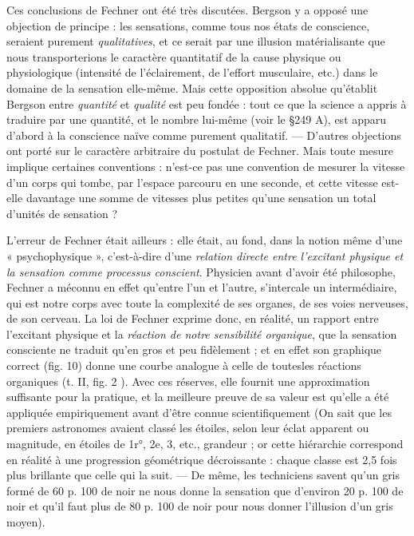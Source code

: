 \vspace{0.24cm}
{\footnotesize 
Ces conclusions de Fechner ont
été très discutées. Bergson y a
opposé une objection de principe :
les sensations, comme tous nos états
de conscience, seraient purement
{\it qualitatives}, et ce serait par une illusion matérialisante que nous
transporterions le caractère quantitatif de la cause physique ou physiologique
(intensité de l’éclairement, de l'effort musculaire, etc.) dans le domaine
de la sensation elle-même. Mais cette opposition absolue qu'établit Bergson
entre {\it quantité} et {\it qualité} est peu fondée : tout ce que la science a
appris à traduire par une quantité, et le nombre lui-même (voir le
\S 249 A), est apparu d’abord à la conscience naïve comme purement qualitatif.
— D’autres objections ont porté sur le caractère arbitraire du postulat
de Fechner. Mais toute mesure implique certaines conventions : n’est-ce
pas une convention de mesurer la vitesse d’un corps qui tombe, par l’espace
parcouru en une seconde, et cette vitesse est-elle davantage une somme de
vitesses plus petites qu'une sensation un total d'unités de sensation ?}
\vspace{0.31cm}

 



L'erreur de Fechner était ailleurs : elle était, au fond, dans la
notion même d’une « psychophysique », c’est-à-dire d’une {\it relation
directe entre l’excitant physique et la sensation comme processus conscient}.
Physicien avant d’avoir été philosophe, Fechner a méconnu en
effet qu’entre l’un et l’autre, s’intercale un intermédiaire, qui est
notre corps avec toute la complexité de ses organes, de ses voies
nerveuses, de son cerveau. La loi de Fechner exprime donc, en réalité,
un rapport entre l’excitant physique et la {\it réaction de notre sensibilité
organique}, que la sensation consciente ne traduit qu’en gros et peu
fidèlement ; et en effet son graphique correct (fig. 10) donne une courbe
analogue à celle de toutesles réactions organiques (t. II, fig. 2 ). Avec ces
réserves, elle fournit une approximation suffisante pour la pratique,
et la meilleure preuve de sa valeur est qu’elle a été appliquée empiriquement
avant d’être connue scientifiquement
{\scriptsize (On sait que les premiers astronomes avaient classé les étoiles, selon leur éclat
apparent ou magnitude, en étoiles de 1r°, 2e, 3, etc., grandeur ; or cette hiérarchie
correspond en réalité à une progression géométrique décroissante : chaque classe est
2,5 fois plus brillante que celle qui la suit. — De même, les techniciens savent qu’un
gris formé de 60 p. 100 de noir ne nous donne la sensation que d'environ 20 p. 100 de
noir et qu’il faut plus de 80 p. 100 de noir pour nous donner l'illusion d’un gris moyen)}.

